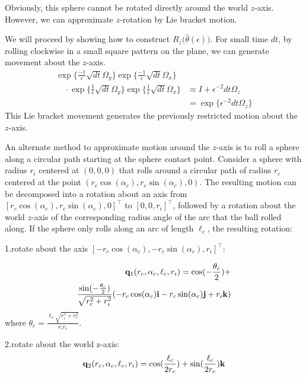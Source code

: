 \documentclass[letter paper, 10pt, conference]{ieeeconf}
\begin{document}
Obviously, this sphere cannot be rotated directly around the world $z$-axis.  However, we can approximate $z$-rotation by Lie bracket motion.

We will proceed by showing how to construct $R_z\!\big(\hat\theta(\epsilon)\big)$.
For small time $dt$, by rolling clockwise in a small square pattern on the plane, we can generate movement about the $z$-axis.
\begin{align*}
\exp\{\frac{-1}{\epsilon} \sqrt{dt} \Omega_y\}
  		    \exp\{\frac{-1}{\epsilon} \sqrt{dt} \Omega_x\}&  \\
	\quad \cdot		     \exp\{\frac{1}{\epsilon} \sqrt{dt} \Omega_y\}  
		      \exp\{\frac{1}{\epsilon} \sqrt{dt} \Omega_x\} &\approx  I + \epsilon^{-2} dt \Omega_z\\
	  &=  \exp\{ \epsilon^{-2} dt  \Omega_z\}
\end{align*}
This Lie bracket movement generates the previously restricted motion about the $z$-axis.	    

An alternate method to approximate motion around the $z$-axis is to roll a sphere  along a circular path starting at the sphere contact point.
Consider a sphere with radius $r_i$ centered at $(0,0,0)$ that rolls around a circular path of radius $r_c$ centered at the point $ (r_c\cos(\alpha_c), r_c\sin(\alpha_c),0)$.  The resulting motion can be decomposed into a rotation about an axis from $[ r_c \cos(\alpha_c), r_c\sin(\alpha_c),0]^\top$ to $[ 0,0,r_i]^\top$, followed by a rotation about the world $z$-axis of the corresponding radius angle of the arc that the ball rolled along.
If the sphere only rolls along an arc of length $\ell_c$, the resulting rotation:

1.rotate about the axis $[ -r_c \cos(\alpha_c), -r_c\sin(\alpha_c),r_i]^\top$:

\begin{align}\nonumber
{\bf q}_1(r_c, \alpha_c, \ell_c, r_i)   = \cos( -\frac{\theta_c}{2})+\\ \frac{\sin({-\frac{\theta_c}{2}})}{\sqrt{r_c^2+r_i^2}}(-r_c\cos(\alpha_c){\bf i}-r_c\sin(\alpha_c){\bf j}+r_i{\bf k}) \label{eq:RotatingAboutACircleArc1}
       \end{align}
where $\theta_c=\frac{\ell_c\sqrt{r_i^2+r_c^2}}{r_ir_c}$.

2.rotate about the world z-axis:
\begin{align}
{\bf q}_2(r_c, \alpha_c, \ell_c, r_i)=\cos(\frac{\ell_c}{2r_c})+\sin(\frac{\ell_c}{2r_c}){\bf k}\label{eq:RotatingAboutACircleArc2}
\end{align}
\end{document}
